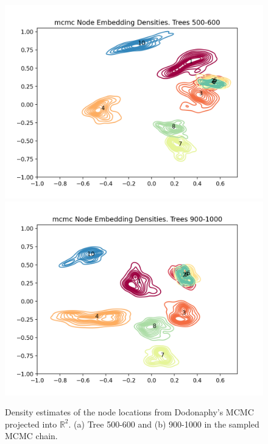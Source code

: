 \documentclass[11pt]{article}
\begin{document}
\begin{figure}[htbp]
\begin{center}
\includegraphics[width=.5\linewidth]{fig/locations_500.png}%
\includegraphics[width=.5\linewidth]{fig/locations_900.png}
\caption{Density estimates of the node locations from Dodonaphy's MCMC projected into $\mathbb{R}^{2}$. (a) Tree 500-600 and (b) 900-1000 in the sampled MCMC chain.}
\label{fig:locations}
\end{center}
\end{figure}
\end{document}
